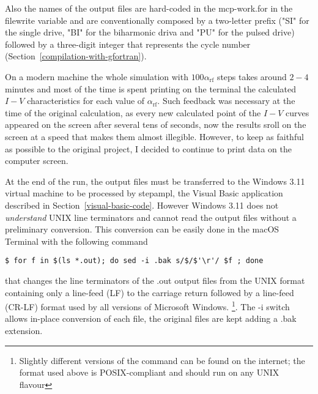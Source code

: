 Also the names of the output files are hard-coded in the \textsf{mcp-work.for} in the \textsf{filewrite} variable and are conventionally composed by a two-letter prefix ("SI" for the single drive, "BI" for the biharmonic driva and "PU" for the pulsed drive) followed by a three-digit integer that represents the cycle number (Section~\ref{compilation-with-gfortran}).

On a modern machine the whole simulation with $100 \alpha_\mathrm{rf}$ steps takes around $2 - 4$ minutes and most of the time is spent printing on the terminal the calculated $I - V$ characteristics for each value of $\alpha_\mathrm{rf}$. Such feedback was necessary at the time of the original calculation, as every new calculated point of the $I - V$ curves appeared on the screen after several tens of seconds, now the results sroll on the screen at a speed that makes them almost illegible.
However, to keep as faithful as possible to the original project, I decided to continue to print data on the computer screen.

At the end of the run, the output files must be transferred to the Windows 3.11 virtual machine to be processed by \textsf{stepampl}, the Visual Basic application described in Section~\ref{visual-basic-code}. However Windows 3.11 does not \emph{understand} UNIX line terminators and cannot read the output files without a preliminary conversion. 
This conversion can be easily done in the macOS Terminal with the following command

\begin{lstlisting}
$ for f in $(ls *.out); do sed -i .bak s/$/$'\r'/ $f ; done
\end{lstlisting}

that changes the line terminators of the \textsf{.out} output files from the UNIX format containing only a line-feed (LF) to the carriage return followed by a line-feed (CR-LF) format used by all versions of Microsoft Windows. 
\footnote{Slightly different versions of the command can be found on the internet; the format used above is POSIX-compliant and should run on any UNIX flavour}.
The \textsf{-i} switch allows in-place conversion of each file, the original files are kept adding a \textsf{.bak} extension.

